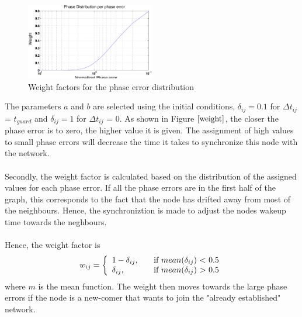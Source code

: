 \documentclass[a4paper,10pt]{report}
\begin{document}
\begin{figure}[t]
\centering
\includegraphics[width= 0.5\textwidth]{weight}
\caption{Weight factors for the phase error distribution}
\label{weight}
\end{figure}
The parameters $a$ and $b$ are selected using the initial conditions, $\delta_{ij}=0.1$ for $\Delta t_{ij}$ = $t_{guard}$ and $\delta_{ij}=1$ for $\Delta t_{ij}$ = 0. As shown in Figure $\ref{weight}$, the closer the phase error is to zero, the higher value it is given. The assignment of high values to  small phase errors will decrease the time it takes to synchronize  this node with the network.
\paragraph*{} \noindent
Secondly, the weight factor is calculated based on the distribution of the assigned values for each phase error. If all the phase errors are in the first half of the graph, this corresponds to the fact that the node has drifted away from most of the neighbours. Hence, the synchroniztion is made to adjust the nodes wakeup time towards the neghbours. \paragraph*{} \noindent
Hence, the weight factor is
\[w_{ij} = \left\{
\begin{array}{l l}
  1 - \delta_{ij},& \quad \mbox{if $mean(\delta_{ij}$) $<$ 0.5}\\
 \delta_{ij}, & \quad \mbox{if $mean(\delta_{ij}$) $>$ 0.5}\\ \end{array} \right. \]
where $m$ is the mean function.
The weight then moves towards the large phase errors if the node is a new-comer that wants to join the "already established" network.
\end{document}
